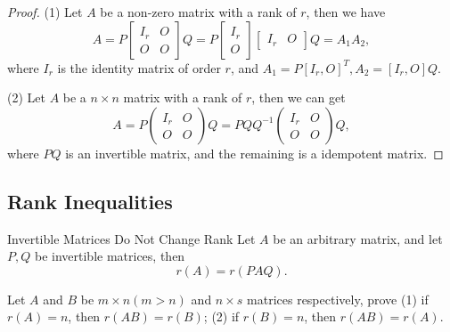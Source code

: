 \begin{proof}
  (1) Let $A$ be a non-zero matrix with a rank of $r$, then we have
  \begin{equation}
    A=P\begin{bmatrix}I_r&O\\O&O\end{bmatrix}Q=P\begin{bmatrix}I_r\\O\end{bmatrix}\begin{bmatrix}I_r&O\end{bmatrix}Q
    = A_1 A_2,
  \end{equation}
  where $I_r$ is the identity matrix of order $r$,
  and $A_1 = P [I_r, O]^T, A_2 = [I_r, O]Q$.

  (2) Let $A$ be a $n \times n$ matrix with a rank of $r$,
  then we can get
  \begin{equation}
    A=P\begin{pmatrix}I_r&O\\O&O\end{pmatrix}Q=PQQ^{-1}\begin{pmatrix}I_r&O\\O&O\end{pmatrix}Q,
  \end{equation}
  where $PQ$ is an invertible matrix, and the remaining is a idempotent matrix.
\end{proof}

\subsection{Rank Inequalities}

\begin{lemma}{Invertible Matrices Do Not Change Rank}{}
  Let $A$ be an arbitrary matrix,
  and let $P, Q$ be invertible matrices,
  then
  \begin{equation}
    r(A) = r(PAQ).
  \end{equation}
\end{lemma}

\begin{example}{}{}
  Let $A$ and $B$ be $m \times n (m > n)$ and $n \times s$ matrices respectively,
  prove (1) if $r(A) = n$, then $r(AB) = r(B)$;
  (2) if $r(B) = n$, then $r(AB) = r(A)$.
\end{example}

